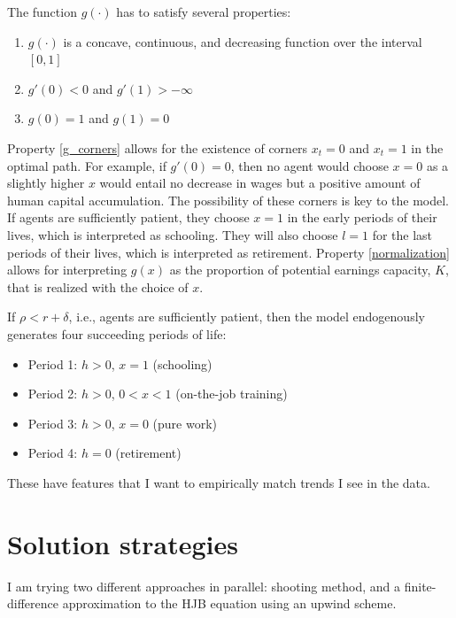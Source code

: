 \documentclass[12pt]{article}
\begin{document}
The function $g(\cdot)$ has to satisfy several properties:
\begin{enumerate}
    \item $g(\cdot)$ is a concave, continuous, and decreasing function over the interval $[0,1]$ \label{labor_market_eqm}
    \item $g'(0) < 0$ and $g'(1) > -\infty$ \label{g_corners}
    \item $g(0) = 1$ and $g(1) = 0$ \label{normalization}
\end{enumerate}
Property \ref{g_corners} allows for the existence of corners $x_t = 0$ and $x_t = 1$ in the optimal path.
For example, if $g'(0) = 0$, then no agent would choose $x = 0$ as a slightly higher $x$ would entail no decrease in wages but a positive amount of human capital accumulation. 
The possibility of these corners is key to the model. If agents are sufficiently patient, they choose $x = 1$ in the early periods of their lives, which is interpreted as schooling.
They will also choose $l = 1$ for the last periods of their lives, which is interpreted as retirement.
Property \ref{normalization} allows for interpreting $g(x)$ as the proportion of potential earnings capacity, $K$, that is realized with the choice of $x$.

If $\rho < r + \delta$, i.e., agents are sufficiently patient, then the model endogenously generates four succeeding periods of life:
\begin{itemize}
    \item Period 1: $h > 0$, $x = 1$ (schooling)
    \item Period 2: $h > 0$, $0 < x < 1$ (on-the-job training)
    \item Period 3: $h > 0$, $x = 0$ (pure work)
    \item Period 4: $h = 0$ (retirement)
\end{itemize}
These have features that I want to empirically match trends I see in the data.

\section{Solution strategies}
I am trying two different approaches in parallel: shooting method, and a finite-difference approximation to the HJB equation using an upwind scheme.
\end{document}
